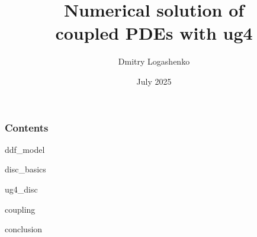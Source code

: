 \documentclass[xcolor=dvipsnames]{beamer}
\title
 [ug4: Coupling equations]
 {Numerical solution of \\ coupled PDEs with ug4}
\author [D. Logashenko] {Dmitry Logashenko}
\institute [CEMSE]
{CEMSE, KAUST, Saudi Arabia}
\date [Jul. 2025] {July 2025}
\begin{document}
\frame {\titlepage}

\begin {frame} [t]
\frametitle {Contents}
\tableofcontents
\end {frame}

 {ddf_model}

 {disc_basics}

 {ug4_disc}

 {coupling}

 {conclusion}
\end{document}
